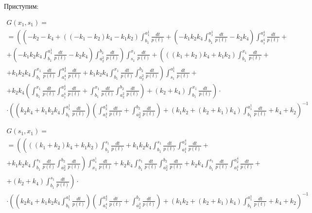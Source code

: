 \documentclass[a4paper,12pt]{article} %
\begin{document}
Приступим:

\begin{multline}
	G(x_1,s_1)=\\=
	\left(
		\left(
			-k_2-k_4+\left( \left( -k_1-k_2\right)  k_4-k_1 k_2\right)  \int_{b_1}^{a_1^1}\frac{dt}{p(t)}+\left( -k_1 k_2 k_4 \int_{b_1}^{a_1^1}\frac{dt}{p(t)}-k_2 k_4\right)  \int_{a_1^4}^{a_2^4}\frac{dt}{p(t)}
			\right. \right. + \\ + \left. \left.
			\left( -k_1 k_2 k_4 \int_{b_1}^{a_1^1}\frac{dt}{p(t)}-k_2 k_4\right)  \int_{a_2^2}^{b_2}\frac{dt}{p(t)}
		\right)
		\int_{s_1}^{x_1}\frac{dt}{p(t)}+\left( \left( \left( k_1+k_2\right)  k_4+k_1 k_2\right)  \int_{b_1}^{x_1}\frac{dt}{p(t)}
		\right. \right. + \\ + \left. \left.
		k_1 k_2 k_4 \int_{b_1}^{x_1}\frac{dt}{p(t)} \int_{a_1^4}^{a_2^4}\frac{dt}{p(t)}+k_1 k_2 k_4 \int_{b_1}^{x_1}\frac{dt}{p(t)} \int_{a_2^2}^{b_2}\frac{dt}{p(t)}\right)  \int_{s_1}^{a_1^1}\frac{dt}{p(t)}
		\right. + \\ + \left.
		k_2 k_4 \left( \int_{b_1}^{x_1}\frac{dt}{p(t)} \int_{a_1^4}^{a_2^4}\frac{dt}{p(t)}+\int_{b_1}^{x_1}\frac{dt}{p(t)} \int_{a_2^2}^{b_2}\frac{dt}{p(t)}\right) +\left( k_2+k_4\right)  \int_{b_1}^{x_1}\frac{dt}{p(t)}
	\right) \cdot \\ \cdot \left(
		\left( k_2 k_4+k_1 k_2 k_4 \int_{b_1}^{a_1^1}\frac{dt}{p(t)}\right)
		\left( \int_{a_1^4}^{a_2^4}\frac{dt}{p(t)}+ \int_{a_2^2}^{b_2}\frac{dt}{p(t)} \right)+
		\left( k_1 k_2+\left( k_2+k_1\right)  k_4\right)  \int_{b_1}^{a_1^1}\frac{dt}{p(t)}+k_4+k_2
	\right)^{-1}
\end{multline}


\begin{multline}
	G(s_1,x_1)=\\=
	\left(
		\left( \left( \left( k_1+k_2\right)  k_4+k_1 k_2\right)  \int_{b_1}^{s_1}\frac{dt}{p(t)}
		+%
		k_1 k_2 k_4 \int_{b_1}^{s_1}\frac{dt}{p(t)} \int_{a_1^4}^{a_2^4}\frac{dt}{p(t)}
		\right. \right. + \\ + \left. \left.
		k_1 k_2 k_4 \int_{b_1}^{s_1}\frac{dt}{p(t)} \int_{a_2^2}^{b_2}\frac{dt}{p(t)}\right)  \int_{x_1}^{a_1^1}\frac{dt}{p(t)}+k_2 k_4 \int_{b_1}^{s_1}\frac{dt}{p(t)} \int_{a_2^2}^{b_2}\frac{dt}{p(t)}+k_2 k_4 \int_{b_1}^{s_1}\frac{dt}{p(t)} \int_{a_1^4}^{a_2^4}\frac{dt}{p(t)}
		\right. + \\ + \left.
		\left( k_2+k_4\right)  \int_{b_1}^{s_1}\frac{dt}{p(t)}
	\right) \cdot \\ \cdot \left(
		\left( k_2 k_4+k_1 k_2 k_4 \int_{b_1}^{a_1^1}\frac{dt}{p(t)}\right)
		\left( \int_{a_1^4}^{a_2^4}\frac{dt}{p(t)}+ \int_{a_2^2}^{b_2}\frac{dt}{p(t)} \right)+
		\left( k_1 k_2+\left( k_2+k_1\right)  k_4\right)  \int_{b_1}^{a_1^1}\frac{dt}{p(t)}+k_4+k_2
	\right)^{-1}
\end{multline}
\end{document}
